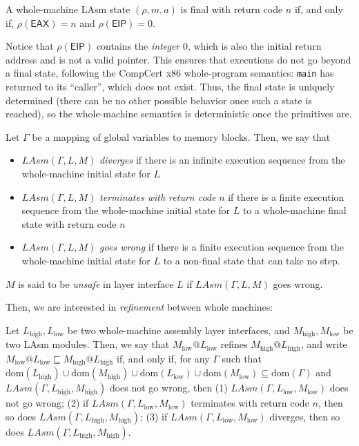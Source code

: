 \begin{definition}
A whole-machine LAsm state $(\rho, m, a)$ is final with return code
$n$ if, and only if, $\rho(\mathsf{EAX}) = n$ and $\rho(\mathsf{EIP}) =
0$.
\end{definition}

Notice that $\rho(\mathsf{EIP})$ contains the \emph{integer} 0,
which is also the initial return address and is not a valid pointer.
This ensures that executions do not
go beyond a final state, following the CompCert x86 whole-program
semantics: \texttt{main} has returned to its ``caller'', which does
not exist. Thus, the final state is uniquely determined (there can be
no other possible behavior once such a state is reached), so the
whole-machine semantics is deterministic once the primitives are.

\begin{definition}
Let $\Gamma$ be a mapping of global variables to memory blocks. Then, we say that
\begin{itemize}
\item $\mathit{LAsm}(\Gamma, L, M)$ \emph{diverges} if there is an
  infinite execution sequence from the whole-machine initial state for $L$
\item $\mathit{LAsm}(\Gamma, L, M)$ \emph{terminates with return code} $n$ if there is a finite execution sequence from the whole-machine initial state for $L$ to a whole-machine final state with return code $n$
\item $\mathit{LAsm}(\Gamma, L, M)$ \emph{goes wrong} if there is a finite execution sequence from the whole-machine initial state for $L$ to a non-final state that can take no step.
\end{itemize}
$M$ is said to be \emph{unsafe} in layer interface $L$ if $\mathit{LAsm}(\Gamma, L, M)$ goes wrong.
\end{definition}

Then, we are interested in \emph{refinement} between whole machines:
\begin{definition}
Let $L_{\text{high}}, L_{\text{low}}$ be two whole-machine assembly
layer interfaces, and $M_{\text{high}}, M_{\text{low}}$ be two LAsm
modules. Then, we say that $M_{\text{low}} @ L_{\text{low}}$ refines
$M_{\text{high}} @ L_{\text{high}}$, and write $M_{\text{low}} @
L_{\text{low}} \sqsubseteq M_{\text{high}} @ L_{\text{high}}$ if,
and only if, for any $\Gamma$ such that $
\mathrm{dom}(L_{\text{high}}) \cup \mathrm{dom}(M_{\text{high}}) \cup
\mathrm{dom}(L_{\text{low}}) \cup \mathrm{dom}(M_{\text{low}})
\subseteq \mathrm{dom}(\Gamma)$ and $\mathit{LAsm}(\Gamma, L_{\text{high}},
M_{\text{high}})$ does not go wrong, then
(1) $\mathit{LAsm}(\Gamma, L_{\text{low}}, M_{\text{low}})$ does not go wrong;
(2) if $\mathit{LAsm}(\Gamma, L_{\text{low}}, M_{\text{low}})$
  terminates with return code $n$, then so does $\mathit{LAsm}(\Gamma,
  L_{\text{high}}, M_{\text{high}})$;
(3) if $\mathit{LAsm}(\Gamma, L_{\text{low}}, M_{\text{low}})$
  diverges, then so does $\mathit{LAsm}(\Gamma, L_{\text{high}},
  M_{\text{high}})$.
\end{definition}


